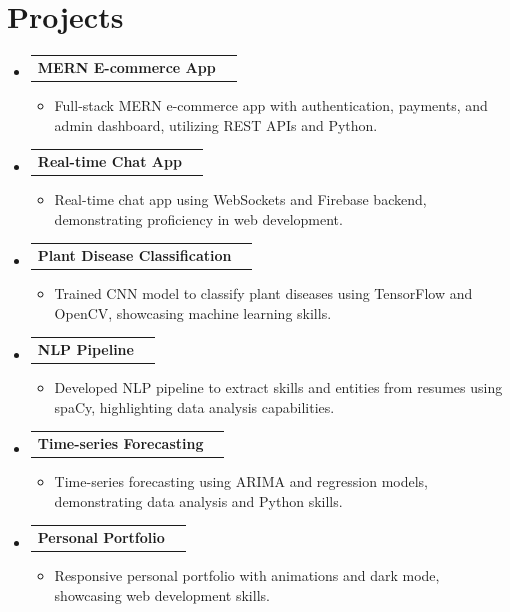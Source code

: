 \documentclass[a4paper,10pt]{article}
\makeatletter
\newcommand{\resumeItem}[1]{
  \item\small{#1 \vspace{-2pt}}
}
\newcommand{\resumeProjectHeading}[2]{
  \vspace{-1pt}\item
    \begin{tabular*}{0.97\textwidth}{l@{\extracolsep{\fill}}r}
      \textbf{#1} & \textit{\small#2} \\
    \end{tabular*}\vspace{-5pt}
}
\newcommand{\resumeSubHeadingListStart}{\begin{itemize}[leftmargin=0.15in, label={}]}
\newcommand{\resumeSubHeadingListEnd}{\end{itemize}}
\newcommand{\resumeItemListStart}{\begin{itemize}[leftmargin=0.2in]}
\newcommand{\resumeItemListEnd}{\end{itemize}\vspace{-5pt}}
\makeatother
\begin{document}
\section{Projects}
\resumeSubHeadingListStart
  \resumeProjectHeading
    {MERN E-commerce App}{}
        \resumeItemListStart
            \resumeItem{Full-stack MERN e-commerce app with authentication, payments, and admin dashboard, utilizing REST APIs and Python.}
          \resumeItemListEnd
      \resumeProjectHeading
    {Real-time Chat App}{}
        \resumeItemListStart
            \resumeItem{Real-time chat app using WebSockets and Firebase backend, demonstrating proficiency in web development.}
          \resumeItemListEnd
      \resumeProjectHeading
    {Plant Disease Classification}{}
        \resumeItemListStart
            \resumeItem{Trained CNN model to classify plant diseases using TensorFlow and OpenCV, showcasing machine learning skills.}
          \resumeItemListEnd
      \resumeProjectHeading
    {NLP Pipeline}{}
        \resumeItemListStart
            \resumeItem{Developed NLP pipeline to extract skills and entities from resumes using spaCy, highlighting data analysis capabilities.}
          \resumeItemListEnd
      \resumeProjectHeading
    {Time-series Forecasting}{}
        \resumeItemListStart
            \resumeItem{Time-series forecasting using ARIMA and regression models, demonstrating data analysis and Python skills.}
          \resumeItemListEnd
      \resumeProjectHeading
    {Personal Portfolio}{}
        \resumeItemListStart
            \resumeItem{Responsive personal portfolio with animations and dark mode, showcasing web development skills.}
          \resumeItemListEnd
    \resumeSubHeadingListEnd
\vspace{4pt}


\end{document}
